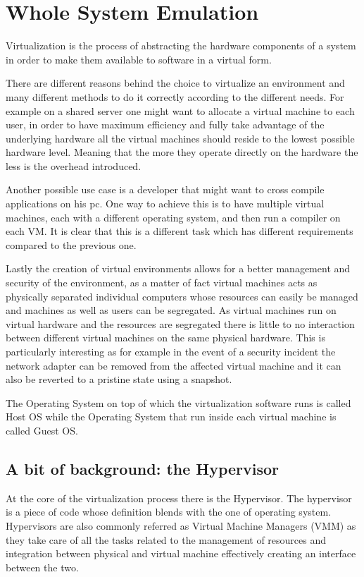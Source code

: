 \chapter{Whole System Emulation}

Virtualization is the process of abstracting the hardware components of a system in order to make them available to software in a virtual form.

There are different reasons behind the choice to virtualize an environment and many different methods to do it correctly according to the different needs. For example on a shared server one might want to allocate a virtual machine to each user, in order to have maximum efficiency and fully take advantage of the underlying hardware all the virtual machines should reside to the lowest possible hardware level. Meaning that the more they operate directly on the hardware the less is the overhead introduced.

Another possible use case is a developer that might want to cross compile applications on his pc. One way to achieve this is to have multiple virtual machines, each with a different operating system, and then run a compiler on each VM. It is clear that this is a different task which has different requirements compared to the previous one.

Lastly the creation of virtual environments allows for a better management and security of the environment, as a matter of fact virtual machines acts as physically separated individual computers whose resources can easily be managed and machines as well as users can be segregated. As virtual machines run on virtual hardware and the resources are segregated there is little to no interaction between different virtual machines on the same physical hardware. This is particularly interesting as for example in the event of a security incident the network adapter can be removed from the affected virtual machine and it can also be reverted to a pristine state using a snapshot. 

The Operating System on top of which the virtualization software runs is called Host OS while the Operating System that run inside each virtual machine is called Guest OS. 

\section{A bit of background: the Hypervisor}

At the core of the virtualization process there is the Hypervisor. The hypervisor is a piece of code whose definition blends with the one of operating system. Hypervisors are also commonly referred as Virtual Machine Managers (VMM) as they take care of all the tasks related to the management of resources and integration between physical and virtual machine effectively creating an interface between the two.

